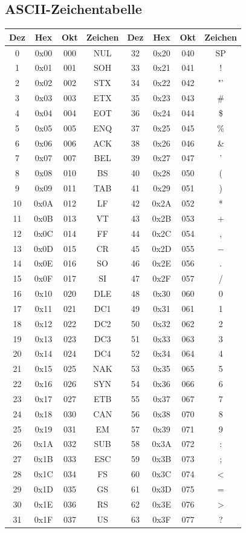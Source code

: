 \documentclass[a4paper,10pt]{article}
\begin{document}
\subsection{ASCII-Zeichentabelle}
{\footnotesize
\begin{longtable}{|c|c|c|c||c|c|c|c|}
\hline
Dez & Hex & Okt & Zeichen & Dez & Hex & Okt & Zeichen\\
\hline
0 & 0x00 & 000 & NUL & 32 & 0x20 & 040 & SP\\
1 & 0x01 & 001 & SOH & 33 & 0x21 & 041 & ! \\
2 & 0x02 & 002 & STX & 34 & 0x22 & 042 & "'\\
3 & 0x03 & 003 & ETX & 35 & 0x23 & 043 & \# \\
4 & 0x04 & 004 & EOT & 36 & 0x24 & 044 & \$ \\
5 & 0x05 & 005 & ENQ & 37 & 0x25 & 045 & \% \\
6 & 0x06 & 006 & ACK & 38 & 0x26 & 046 & \& \\
7 & 0x07 & 007 & BEL & 39 & 0x27 & 047 & ' \\
8 & 0x08 & 010 & BS & 40 & 0x28 & 050 & (  \\
9 & 0x09 & 011 & TAB & 41 & 0x29 & 051 &  ) \\
10 & 0x0A & 012 & LF & 42 & 0x2A & 052 & * \\
11 & 0x0B & 013 & VT & 43 & 0x2B & 053 & + \\
12 & 0x0C & 014 & FF & 44 & 0x2C & 054 & , \\
13 & 0x0D & 015 & CR & 45 & 0x2D & 055 & $-$ \\
14 & 0x0E & 016 & SO & 46 & 0x2E & 056 & . \\
15 & 0x0F & 017 & SI & 47 & 0x2F & 057 & / \\
16 & 0x10 & 020 & DLE & 48 & 0x30 & 060 & 0 \\
17 & 0x11 & 021 & DC1 & 49 & 0x31 & 061 & 1 \\
18 & 0x12 & 022 & DC2 & 50 & 0x32 & 062 & 2 \\
19 & 0x13 & 023 & DC3 & 51 & 0x33 & 063 & 3 \\
20 & 0x14 & 024 & DC4 & 52 & 0x34 & 064 & 4 \\
21 & 0x15 & 025 & NAK & 53 & 0x35 & 065 & 5 \\
22 & 0x16 & 026 & SYN & 54 & 0x36 & 066 & 6 \\
23 & 0x17 & 027 & ETB & 55 & 0x37 & 067 & 7 \\
24 & 0x18 & 030 & CAN & 56 & 0x38 & 070 & 8 \\
25 & 0x19 & 031 & EM & 57 & 0x39 & 071 & 9 \\
26 & 0x1A & 032 & SUB & 58 & 0x3A & 072 & : \\
27 & 0x1B & 033 & ESC & 59 & 0x3B & 073 & ; \\
28 & 0x1C & 034 & FS & 60 & 0x3C & 074 & $<$ \\
29 & 0x1D & 035 & GS & 61 & 0x3D & 075 & =\\
30 & 0x1E & 036 & RS & 62 & 0x3E & 076 & $>$ \\
31 & 0x1F & 037 & US & 63 & 0x3F & 077 & ? \\
\hline


\end{longtable}}
\end{document}
